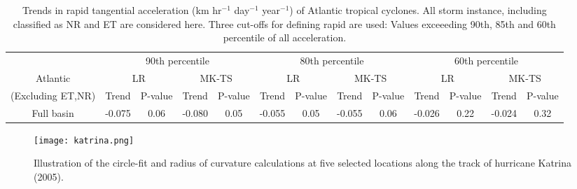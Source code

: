 \documentclass[wcd,manuscript]{copernicus}
\begin{document}
\begin{table*}[t]
  \caption{Trends in rapid tangential acceleration (km hr$^{-1}$ day$^{-1}$ year$^{-1}$) of Atlantic tropical cyclones. All storm instance, including classified as NR and ET are considered here. Three cut-offs for defining rapid are used: Values exceeeding 90th, 85th and 60th percentile of all acceleration. }

\begin{tabular}{|c|cccc|cccc|cccc|}
\hline
& \multicolumn{4}{|c|}{ 90th percentile } & \multicolumn{4}{|c|}{80th percentile }& \multicolumn{4}{|c|}{60th percentile}\\
Atlantic  & \multicolumn{2}{c}{LR} & \multicolumn{2}{c|}{MK-TS}& \multicolumn{2}{c}{LR} & \multicolumn{2}{c|}{MK-TS} & \multicolumn{2}{c}{LR} &  \multicolumn{2}{c|}{MK-TS}\\
(Excluding ET,NR) & Trend & P-value & Trend & P-value & Trend & P-value & Trend & P-value & Trend & P-value & Trend & P-value\\
\hline
Full basin &  -0.075 & 0.06 & -0.080 & 0.05 & -0.055 & 0.05 & -0.055 & 0.06  & -0.026 & 0.22 & -0.024 & 0.32\\


\hline
\hline
\end{tabular}
\label{tab:ATLAC}
\end{table*}






\begin{figure*}[t]
\texttt{[image: katrina.png]}
\caption{Illustration of the circle-fit and radius of curvature calculations at
five selected locations along the track of hurricane Katrina (2005).}\label{fig:track}
\end{figure*}


\clearpage


\end{document}
